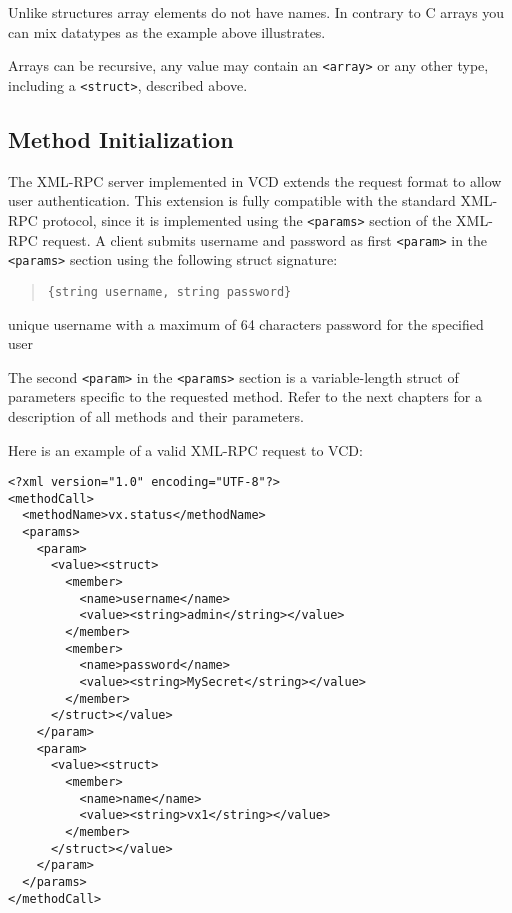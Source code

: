 Unlike structures array elements do not have names. In contrary to C arrays you
can mix datatypes as the example above illustrates.

Arrays can be recursive, any value may contain an \verb,<array>, or any other
type, including a \verb,<struct>,, described above.


\subsection{Method Initialization}

The XML-RPC server implemented in VCD extends the request format to allow user
authentication. This extension is fully compatible with the standard XML-RPC
protocol, since it is implemented using the \verb,<params>, section of the
XML-RPC request. A client submits username and password as first
\verb,<param>, in the \verb,<params>, section using the following struct
signature:

\begin{quote}
\verb|{string username, string password}|
\end{quote}

\begin{labeling}{}
 unique username with a maximum of 64 characters
 password for the specified user
\end{labeling}

The second \verb,<param>, in the \verb,<params>, section is a variable-length
struct of parameters specific to the requested method. Refer to the next
chapters for a description of all methods and their parameters.

Here is an example of a valid XML-RPC request to VCD:

\begin{verbatim}
<?xml version="1.0" encoding="UTF-8"?>
<methodCall>
  <methodName>vx.status</methodName>
  <params>
    <param>
      <value><struct>
        <member>
          <name>username</name>
          <value><string>admin</string></value>
        </member>
        <member>
          <name>password</name>
          <value><string>MySecret</string></value>
        </member>
      </struct></value>
    </param>
    <param>
      <value><struct>
        <member>
          <name>name</name>
          <value><string>vx1</string></value>
        </member>
      </struct></value>
    </param>
  </params>
</methodCall>
\end{verbatim}

